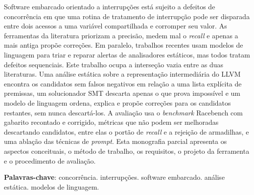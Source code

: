 \setlength{\absparsep}{18pt}
\begin{resumo}
Software embarcado orientado a interrupções está sujeito a defeitos de
concorrência em que uma rotina de tratamento
de interrupção pode ser disparada entre dois acessos a uma variável
compartilhada e corromper seu valor. As ferramentas da literatura priorizam a
precisão, medem mal o \textit{recall} e apenas a mais antiga propõe correções. Em
paralelo, trabalhos recentes usam modelos de linguagem para triar e reparar
alertas de analisadores estáticos, mas todos tratam defeitos sequenciais. Este
trabalho ocupa a interseção vazia entre as duas literaturas. Uma análise
estática sobre a representação intermediária do LLVM encontra os candidatos sem
falsos negativos em relação a uma lista explícita de premissas, um solucionador
SMT descarta apenas o que prova impossível e um modelo de linguagem ordena,
explica e propõe correções para os candidatos restantes, sem nunca descartá-los.
A avaliação usa o \textit{benchmark} Racebench com gabarito recontado e
corrigido, métricas que não podem ser melhoradas descartando candidatos, entre
elas o portão de \textit{recall} e a rejeição de armadilhas, e uma ablação das
técnicas de \textit{prompt}. Esta monografia parcial
apresenta os aspectos conceituais, o método de trabalho, os requisitos, o
projeto da ferramenta e o procedimento de avaliação.

\textbf{Palavras-chave}: concorrência. interrupções. software embarcado.
análise estática. modelos de linguagem.
\end{resumo}
